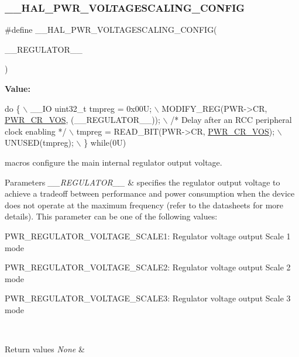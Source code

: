 \subsubsection{\texorpdfstring{\+\_\+\+\_\+\+H\+A\+L\+\_\+\+P\+W\+R\+\_\+\+V\+O\+L\+T\+A\+G\+E\+S\+C\+A\+L\+I\+N\+G\+\_\+\+C\+O\+N\+F\+IG}{\_\_HAL\_PWR\_VOLTAGESCALING\_CONFIG}}
{\footnotesize\ttfamily \#define \+\_\+\+\_\+\+H\+A\+L\+\_\+\+P\+W\+R\+\_\+\+V\+O\+L\+T\+A\+G\+E\+S\+C\+A\+L\+I\+N\+G\+\_\+\+C\+O\+N\+F\+IG(\begin{DoxyParamCaption}\item[{}]{\+\_\+\+\_\+\+R\+E\+G\+U\+L\+A\+T\+O\+R\+\_\+\+\_\+ }\end{DoxyParamCaption})}

{\bfseries Value\+:}
\begin{DoxyCode}
\textcolor{keywordflow}{do} \{                                                     \(\backslash\)
                                                            \_\_IO uint32\_t tmpreg = 0x00U;                  
            \(\backslash\)
                                                            MODIFY\_REG(PWR->CR, 
      \mbox{\hyperlink{group___peripheral___registers___bits___definition_gaccc33f1ba4e374e116ffa50f3a503030}{PWR\_CR\_VOS}}, (\_\_REGULATOR\_\_));   \(\backslash\)
                                                            \textcolor{comment}{/* Delay after an RCC peripheral clock enabling
       */}  \(\backslash\)
                                                            tmpreg = READ\_BIT(PWR->CR, 
      \mbox{\hyperlink{group___peripheral___registers___bits___definition_gaccc33f1ba4e374e116ffa50f3a503030}{PWR\_CR\_VOS}});             \(\backslash\)
                                                            UNUSED(tmpreg);                                
           \(\backslash\)
                                                          \} \textcolor{keywordflow}{while}(0U)
\end{DoxyCode}


macros configure the main internal regulator output voltage. 


\begin{DoxyParams}{Parameters}
{\em \+\_\+\+\_\+\+R\+E\+G\+U\+L\+A\+T\+O\+R\+\_\+\+\_\+} & specifies the regulator output voltage to achieve a tradeoff between performance and power consumption when the device does not operate at the maximum frequency (refer to the datasheets for more details). This parameter can be one of the following values\+: \begin{DoxyItemize}
\item P\+W\+R\+\_\+\+R\+E\+G\+U\+L\+A\+T\+O\+R\+\_\+\+V\+O\+L\+T\+A\+G\+E\+\_\+\+S\+C\+A\+L\+E1\+: Regulator voltage output Scale 1 mode \item P\+W\+R\+\_\+\+R\+E\+G\+U\+L\+A\+T\+O\+R\+\_\+\+V\+O\+L\+T\+A\+G\+E\+\_\+\+S\+C\+A\+L\+E2\+: Regulator voltage output Scale 2 mode \item P\+W\+R\+\_\+\+R\+E\+G\+U\+L\+A\+T\+O\+R\+\_\+\+V\+O\+L\+T\+A\+G\+E\+\_\+\+S\+C\+A\+L\+E3\+: Regulator voltage output Scale 3 mode \end{DoxyItemize}
\\
\hline
\end{DoxyParams}

\begin{DoxyRetVals}{Return values}
{\em None} & \\
\hline
\end{DoxyRetVals}

